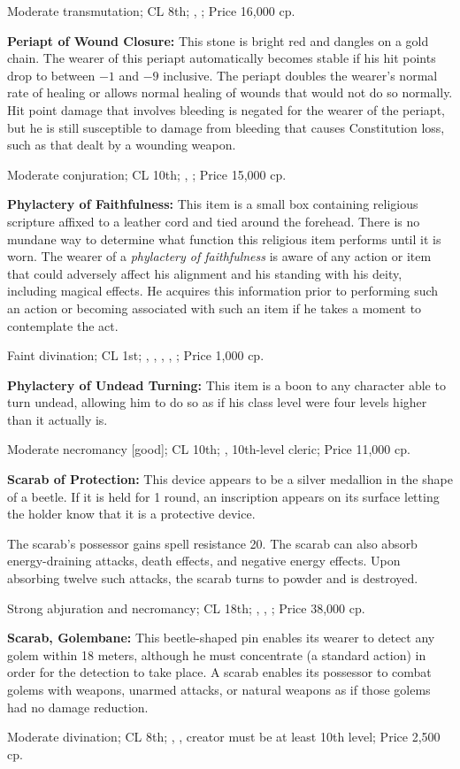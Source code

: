 Moderate transmutation; CL 8th; , ; Price 16,000 cp.

\textbf{Periapt of Wound Closure:} This stone is bright red and dangles on a gold chain. The wearer of this periapt automatically becomes stable if his hit points drop to between $-1$ and $-9$ inclusive. The periapt doubles the wearer's normal rate of healing or allows normal healing of wounds that would not do so normally. Hit point damage that involves bleeding is negated for the wearer of the periapt, but he is still susceptible to damage from bleeding that causes Constitution loss, such as that dealt by a wounding weapon.

Moderate conjuration; CL 10th; , ; Price 15,000 cp.

\textbf{Phylactery of Faithfulness:} This item is a small box containing religious scripture affixed to a leather cord and tied around the forehead. There is no mundane way to determine what function this religious item performs until it is worn. The wearer of a \emph{phylactery of faithfulness} is aware of any action or item that could adversely affect his alignment and his standing with his deity, including magical effects. He acquires this information prior to performing such an action or becoming associated with such an item if he takes a moment to contemplate the act.

Faint divination; CL 1st; , , , , ; Price 1,000 cp.

\textbf{Phylactery of Undead Turning:} This item is a boon to any character able to turn undead, allowing him to do so as if his class level were four levels higher than it actually is.

Moderate necromancy [good]; CL 10th; , 10th-level cleric; Price 11,000 cp.

\textbf{Scarab of Protection:} This device appears to be a silver medallion in the shape of a beetle. If it is held for 1 round, an inscription appears on its surface letting the holder know that it is a protective device.

The scarab's possessor gains spell resistance 20. The scarab can also absorb energy-draining attacks, death effects, and negative energy effects. Upon absorbing twelve such attacks, the scarab turns to powder and is destroyed.

Strong abjuration and necromancy; CL 18th; , , ; Price 38,000 cp.

\textbf{Scarab, Golembane:} This beetle-shaped pin enables its wearer to detect any golem within 18 meters, although he must concentrate (a standard action) in order for the detection to take place. A scarab enables its possessor to combat golems with weapons, unarmed attacks, or natural weapons as if those golems had no damage reduction.

Moderate divination; CL 8th; , , creator must be at least 10th level; Price 2,500 cp.